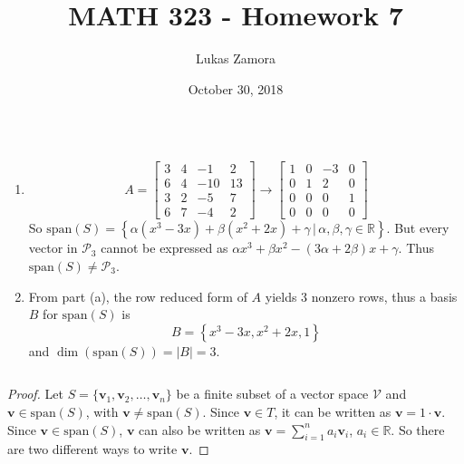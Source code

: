 \documentclass{article}
\title{MATH 323 - Homework 7}
\author{Lukas Zamora}
\date{October 30, 2018}
\theoremstyle{definition}
\begin{document}
    \maketitle
    	
    \begin{prob}{5} $  $
    	\begin{enumerate}[label=\alph*.)]
    		\item 
    			\[
    				A = \begin{bmatrix} 3 & 4 & -1 & 2 \\ 6 & 4 & -10 & 13 \\ 3 & 2 & -5 & 7 \\ 6 & 7 & -4 & 2 \end{bmatrix} \longrightarrow \begin{bmatrix} 1 & 0 & -3 & 0 \\ 0 & 1 & 2 & 0 \\ 0 & 0 & 0 & 1 \\ 0 & 0 & 0 & 0 \end{bmatrix}
    			\]
    			So $ \text{span}(S) = \left\{ \alpha(x^3-3x) + \beta(x^2+2x) + \gamma \, | \, \alpha, \beta, \gamma \in \mathbb{R} \right\} $. But every vector in $ \mathcal{P}_3 $ cannot be expressed as $ \alpha x^3 + \beta x^2 - (3\alpha + 2\beta)x + \gamma $. Thus $ \text{span}(S) \neq \mathcal{P}_3 $.
    			
    		\item From part (a), the row reduced form of $ A $ yields 3 nonzero rows, thus a basis $ B $ for $ \text{span}(S) $ is 
    		\[ B = \left\{ x^3-3x, x^2+2x, 1 \right\} \]
    		and $ \dim(\text{span}(S)) = |B| = 3 $.\\
    	\end{enumerate}
    \end{prob}

	\begin{prob}{10} $  $
		\begin{proof}
			Let $ S = \{ \mathbf{v}_1, \mathbf{v}_2, \dots, \mathbf{v}_n \} $ be a finite subset of a vector space $ \mathcal{V} $ and $ \mathbf{v} \in \text{span}(S) $, with $ \mathbf{v} \neq \text{span}(S) $. Since $ \mathbf{v} \in T $, it can be written as $ \mathbf{v} = 1 \cdot \mathbf{v} $. Since $ \mathbf{v} \in \text{span}(S) $, $ \mathbf{v} $ can also be written as $ \mathbf{v} = \sum_{i=1}^{n} a_i \mathbf{v}_i $, $ a_i \in \mathbb{R} $. So there are two different ways to write $ \mathbf{v} $.
		\end{proof}
	\end{prob}
    
\end{document}
